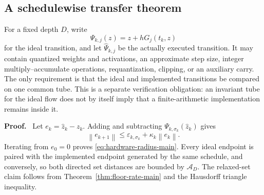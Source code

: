\documentclass[twoside,11pt]{article}
\renewenvironment{proof}[1][Proof]{\par\noindent\textbf{#1.}\ }{\hfill\BlackBox\par\medskip}
\newcommand{\Rel}{\mathrm{rel}}
\newcommand{\norm}[1]{\left\lVert #1\right\rVert}
\newcommand{\RR}{\mathscr{R}}
\newcommand{\dH}{d_{\mathrm H}}
\begin{document}
\subsection{A schedulewise transfer theorem}

For a fixed depth $D$, write
\begin{equation}
 \Psi_{k,j}(z)=z+hG_j(t_k,z)
 \label{eq:ideal-transition-main}
\end{equation}
for the ideal transition, and let $\widehat\Psi_{k,j}$ be the actually executed transition.  It may contain quantized weights and activations, an approximate step size, integer multiply--accumulate operations, requantization, clipping, or an auxiliary carry.  The only requirement is that the ideal and implemented transitions be compared on one common tube.  This is a separate verification obligation: an invariant tube for the ideal flow does not by itself imply that a finite-arithmetic implementation remains inside it.


\begin{proof}
Let $e_k=\widehat z_k-z_k$.  Adding and subtracting $\Psi_{k,\sigma_k}(\widehat z_k)$ gives
\[
 \norm{e_{k+1}}
 \le\varepsilon_{k,\sigma_k}+\kappa_k\norm{e_k}.
\]
Iterating from $e_0=0$ proves \eqref{eq:hardware-radius-main}.  Every ideal endpoint is paired with the implemented endpoint generated by the same schedule, and conversely, so both directed set distances are bounded by $\mathcal A_D$.  The relaxed-set claim follows from Theorem~\ref{thm:floor-rate-main} and the Hausdorff triangle inequality.
\end{proof}
\end{document}
